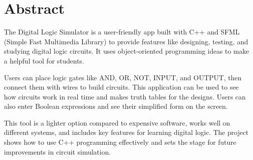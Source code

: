 \section*{Abstract}
The Digital Logic Simulator is a user-friendly app built with C++ and SFML (Simple Fast Multimedia Library) to provide features like designing, testing, and studying digital logic circuits. It uses object-oriented programming ideas to make a helpful tool for students.

\vspace{0.5cm}
Users can place logic gates like AND, OR, NOT, INPUT, and OUTPUT, then connect them with wires to build circuits. This application can be used to see how circuits work in real time and makes truth tables for the designs. Users can also enter Boolean expressions and see their simplified form on the screen.

\vspace{0.5cm}
This tool is a lighter option compared to expensive software, works well on different systems, and includes key features for learning digital logic. The project shows how to use C++ programming effectively and sets the stage for future improvements in circuit simulation.
\clearpage